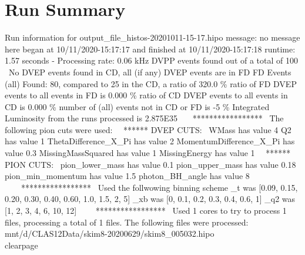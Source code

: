 \documentclass{article}
\begin{document}
\section{Run Summary}

	Run information for output\_file\_histos-20201011-15-17.hipo 
 \Run message: no message here  
 \Script began at 10/11/2020-15:17:17 and finished at 10/11/2020-15:17:18
 \total runtime: 1.57 seconds - Processing rate: 0.06 kHz 
 \No DVPP events found out of a total of 100 
 \ No DVEP events found in CD, all (if any) DVEP events are in FD 
 \Global FD Events (all) Found: 80, compared to 25 in the CD, a ratio of 320.0 \%
 \The ratio of FD DVEP events to all events in FD is  0.000 \%
 \The ratio of CD DVEP events to all events in CD is  0.000 \%
 \The number of (all) events not in CD or FD is  -5 \%
 \Total Integrated Luminosity from the runs processed is 2.875E35 
 \
 \ 
 \
 \****************** 
 \ The following pion cuts were used: 
 \
 \ ****** DVEP CUTS: 
 \ 
 \Cut WMass has value 4 
 \Cut Q2 has value 1 
 \Cut ThetaDifference\_X\_Pi has value 2 
 \Cut MomentumDifference\_X\_Pi has value 0.3 
 \Cut MissingMassSquared has value 1 
 \Cut MissingEnergy has value 1 
 \
 \ ****** PION CUTS: 
 \ 
 \Cut pion\_lower\_mass has value 0.1 
 \Cut pion\_upper\_mass has value 0.18 
 \Cut pion\_min\_momentum has value 1.5 
 \Cut photon\_BH\_angle has value 8 
 \
 \ 
 \ 
 \ ***************** 
 \ Used the follwowing binning scheme 
 \binning\_t was [0.09, 0.15, 0.20, 0.30, 0.40, 0.60, 1.0, 1.5, 2, 5] 
 \binning\_xb was [0, 0.1, 0.2, 0.3, 0.4, 0.6, 1] 
 \binning\_q2 was [1, 2, 3, 4, 6, 10, 12] 
 \
 \ 
 \ 
 \ ***************** 
 \ Used 1 cores to try to process 1 files, processing a total of 1 files. The following files were processed: 
 \/mnt/d/CLAS12Data/skim8-20200629/skim8\_005032.hipo 
 \\clearpage 
\listoffigures
\clearpage
\end{document}
